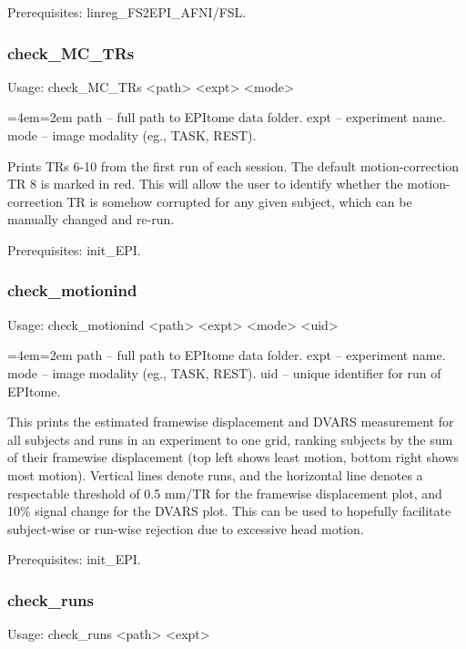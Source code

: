 \documentclass[final,titlepage,letterpaper,oneside,12pt]{article}
\renewcommand{\texttt}[2][BrickRed]{\textcolor{#1}{\ttfamily #2}}%
\newenvironment{blockquote}{%
  \par%
  \medskip
  \leftskip=4em\rightskip=2em%
  \noindent\ignorespaces}{%
  \par\medskip}
\begin{document}
Prerequisites: \texttt{linreg\_FS2EPI\_AFNI/FSL}.

\subsubsection{check\_MC\_TRs}
Usage: \texttt{check\_MC\_TRs <path> <expt> <mode>}

\begin{blockquote}
path -- full path to EPItome data folder.
expt -- experiment name.
mode -- image modality (eg., TASK, REST).
\end{blockquote}

\noindent Prints TRs 6-10 from the first run of each session. The default motion-correction TR 8 is marked in red. This will allow the user to identify whether the motion-correction TR is somehow corrupted for any given subject, which can be manually changed and re-run.

Prerequisites: \texttt{init\_EPI}.

\subsubsection{check\_motionind}
Usage: \texttt{check\_motionind <path> <expt> <mode> <uid>}

\begin{blockquote}
path -- full path to EPItome data folder.
expt -- experiment name.
mode -- image modality (eg., TASK, REST).
uid -- unique identifier for run of EPItome.
\end{blockquote}

\noindent This prints the estimated framewise displacement and DVARS measurement for all subjects and runs in an experiment to one grid, ranking subjects by the sum of their framewise displacement (top left shows least motion, bottom right shows most motion). Vertical lines denote runs, and the horizontal line denotes a respectable threshold of 0.5 mm/TR for the framewise displacement plot, and 10\% signal change for the DVARS plot. This can be used to hopefully facilitate subject-wise or run-wise rejection due to excessive head motion.

Prerequisites: \texttt{init\_EPI}.

\subsubsection{check\_runs}
Usage: \texttt{check\_runs <path> <expt>}
\end{document}
